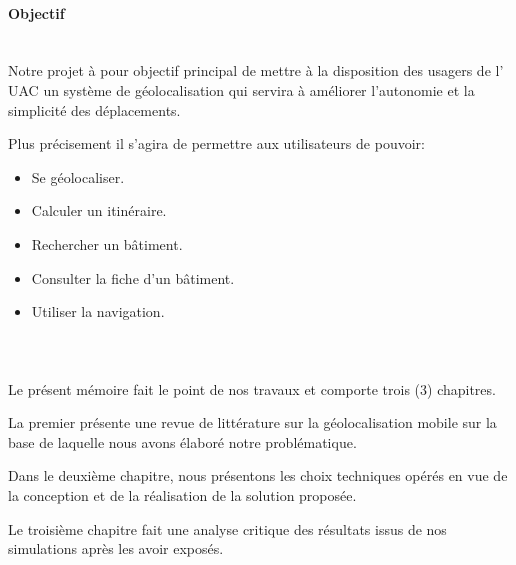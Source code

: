     \paragraph{Objectif\\ \\}
    \small{ 
	  Notre projet à pour objectif principal de mettre à la disposition des usagers de l' UAC
      un système de géolocalisation qui servira à améliorer l'autonomie et la simplicité des déplacements.
      
	  Plus précisement il s'agira de permettre aux utilisateurs de pouvoir:
	
    \begin{itemize}
	\item Se géolocaliser.
	\item Calculer un itinéraire.
	\item Rechercher un bâtiment.
	\item Consulter la fiche d’un bâtiment.
        \item Utiliser la navigation.
    \end{itemize}
    }

    \paragraph{\\}
	\small{
	  Le présent mémoire fait le point de nos travaux et comporte trois (3) chapitres.
	
	  La premier présente une revue de littérature sur la géolocalisation mobile
      sur la base de laquelle nous avons élaboré notre problématique.
    
	  Dans le deuxième chapitre, nous présentons les choix techniques opérés en
      vue de la conception et de la réalisation de la solution proposée.
    
	  Le troisième chapitre fait une analyse critique des résultats issus de nos simulations 
      après les avoir exposés.
	}


